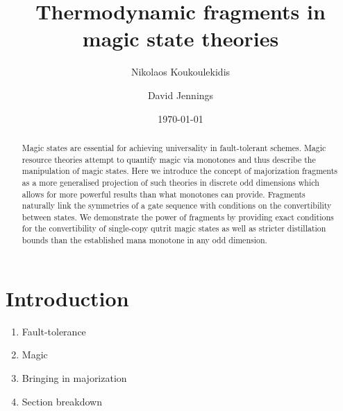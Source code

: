 \documentclass[pra,
aps,
twocolumn,
superscriptaddress,
groupedaddress,
nofootinbib,
reprint
]{revtex4-1}
\begin{document}
\begin{abstract}
Magic states are essential for achieving universality in fault-tolerant schemes.
Magic resource theories attempt to quantify magic via monotones and thus describe the manipulation of magic states.
Here we introduce the concept of majorization fragments as a more generalised projection of such theories in discrete odd dimensions which allows for more powerful results than what monotones can provide.
Fragments naturally link the symmetries of a gate sequence with conditions on the convertibility between states.
We demonstrate the power of fragments by providing exact conditions for the convertibility of single-copy qutrit magic states as well as stricter distillation bounds than the established mana monotone in any odd dimension.
\end{abstract}


\title{Thermodynamic fragments in magic state theories}

\author{Nikolaos Koukoulekidis}
\author{David Jennings}

\date{\today}
\maketitle


\section{Introduction}
\label{sec:intro}

\begin{enumerate}
    \item Fault-tolerance~\cite{cit:raussendorf, cit:gross2, cit:markov, cit:gross, cit:nest, cit:nest2, cit:vidal, cit:fujii, cit:gottesman}
    \item Magic~\cite{cit:veitch, cit:veitch2, cit:wang, cit:wang2, cit:howard, cit:campbell, cit:gross3, cit:gross4}
    \item Bringing in majorization~\cite{cit:cwiklinski, cit:lostaglio2, cit:lostaglio, cit:gour, cit:janzing, cit:brandao2, cit:gour2, cit:marshall, cit:nielsen}
    \item Section breakdown
\end{enumerate}
\end{document}
